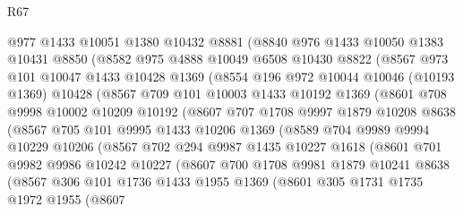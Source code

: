 \begin{lexlean}{R67}
\begin{coremodule}
      @977
      @1433
      @10051
      @1380
      @10432
      @8881
      (@8840
        @976
        @1433
        @10050
        @1383
        @10431
        @8850
        (@8582
          @975
          @4888
          @10049
          @6508
          @10430
          @8822
          (@8567
            @973
            @101
            @10047
            @1433
            @10428
            @1369
            (@8554
              @196
              @972
              @10044
              @10046
              (@10193 @1369)
              @10428
              (@8567
                @709
                @101
                @10003
                @1433
                @10192
                @1369
                (@8601
                  @708
                  @9998
                  @10002
                  @10209
                  @10192
                  (@8607
                    @707
                    @1708
                    @9997
                    @1879
                    @10208
                    @8638
                    (@8567
                      @705
                      @101
                      @9995
                      @1433
                      @10206
                      @1369
                      (@8589
                        @704
                        @9989
                        @9994
                        @10229
                        @10206
                        (@8567
                          @702
                          @294
                          @9987
                          @1435
                          @10227
                          @1618
                          (@8601
                            @701
                            @9982
                            @9986
                            @10242
                            @10227
                            (@8607
                              @700
                              @1708
                              @9981
                              @1879
                              @10241
                              @8638
                              (@8567
                                @306
                                @101
                                @1736
                                @1433
                                @1955
                                @1369
                                (@8601
                                  @305
                                  @1731
                                  @1735
                                  @1972
                                  @1955
                                  (@8607

\end{coremodule}
\end{lexlean}
